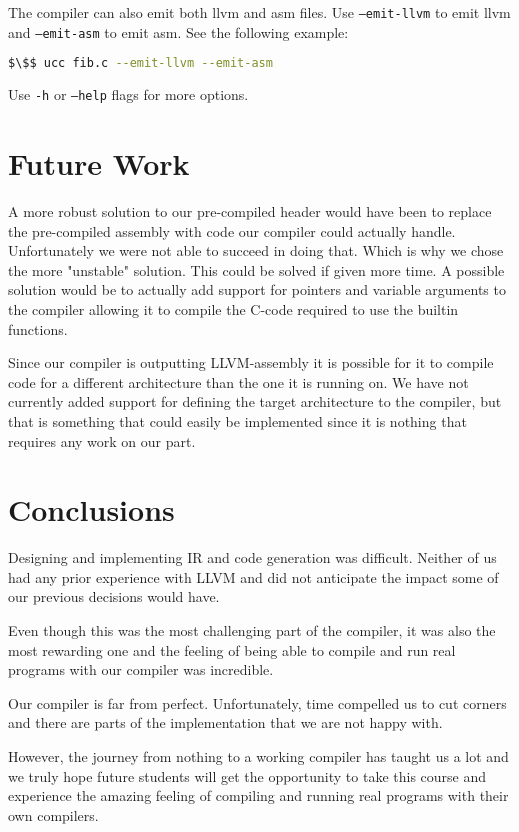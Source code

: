 The compiler can also emit both llvm and asm files. Use \texttt{--emit-llvm} to emit llvm and \texttt{--emit-asm} to emit asm. See the following example:
\begin{lstlisting}[language=bash,numbers=none]
    $\$$ ucc fib.c --emit-llvm --emit-asm
\end{lstlisting}

Use \texttt{-h} or \texttt{--help} flags for more options.


\section{Future Work}

A more robust solution to our pre-compiled header would have been to replace the pre-compiled assembly with code our compiler could actually handle. Unfortunately we were not able to succeed in doing that. Which is why we chose the more "unstable" solution. This could be solved if given more time. A possible solution would be to actually add support for pointers and variable arguments to the compiler allowing it to compile the C-code required to use the builtin functions.


Since our compiler is outputting LLVM-assembly it is possible for it to compile code for a different architecture than the one it is running on. We have not currently added support for defining the target architecture to the compiler, but that is something that could easily be implemented since it is nothing that requires any work on our part.

\section{Conclusions}

Designing and implementing IR and code generation was difficult. Neither of us had any prior experience with LLVM and did not anticipate the impact some of our previous decisions would have.

Even though this was the most challenging part of the compiler, it was also the most rewarding one and the feeling of being able to compile and run real programs with our compiler was incredible.

Our compiler is far from perfect. Unfortunately, time compelled us to cut corners and there are parts of the implementation that we are not happy with.

However, the journey from nothing to a working compiler has taught us a lot and we truly hope future students will get the opportunity to take this course and experience the amazing feeling of compiling and running real programs with their own compilers.

